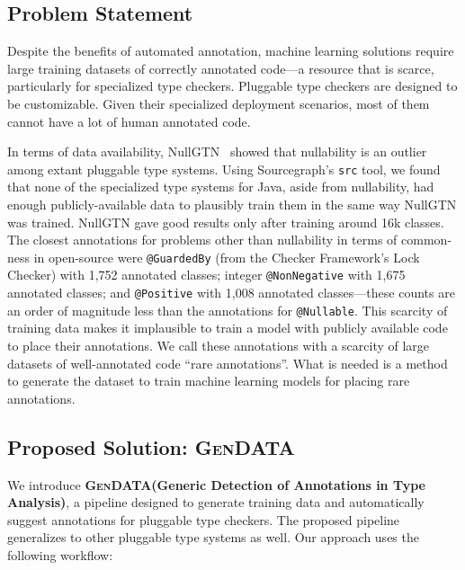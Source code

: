\documentclass[acmsmall,screen,review,anonymous]{acmart}
\makeatletter
\newcommand{\gendata}{\textsc{GenDATA}\xspace}
\newcommand{\cf}{Checker Framework\xspace}
\newcommand{\atmark}[1]{\texttt{@#1}}
\makeatother
\begin{document}
\subsection{Problem Statement}
\label{sec:problem}

Despite the benefits of automated annotation, machine learning solutions require large training datasets of correctly annotated code---a resource that is scarce, particularly for specialized type checkers. Pluggable type checkers are designed to be customizable. Given their specialized deployment scenarios, most of them cannot have a lot of human annotated code.

In terms of data availability, NullGTN~\cite{siddiqui2024inferring} showed that nullability is an outlier among extant pluggable type systems. Using Sourcegraph's \texttt{src} tool, we found that none of the specialized type systems for Java, aside from nullability, had enough publicly-available data to plausibly train them in the same way NullGTN was trained. NullGTN gave good results only after training around 16k classes. The closest annotations for problems other than nullability in terms of common-ness in open-source were \atmark{GuardedBy} (from the \cf's Lock Checker) with 1,752 annotated classes; integer \atmark{NonNegative} with 1,675 annotated classes; and \atmark{Positive} with 1,008 annotated classes---these counts are an order of magnitude less than the annotations for \atmark{Nullable}. This scarcity of training data makes it implausible to train a model with publicly available code to place their annotations. We call these annotations with a scarcity of large datasets of well-annotated code ``rare annotations''. What is needed is a method to generate the dataset to train machine learning models for placing rare annotations.

\subsection{Proposed Solution: \gendata}
\label{sec:solution}

We introduce \textbf{\gendata (Generic Detection of Annotations in Type Analysis)}, a pipeline designed to generate training data and automatically suggest annotations for pluggable type checkers. The proposed pipeline generalizes to other pluggable type systems as well. Our approach uses the following workflow:
\end{document}
